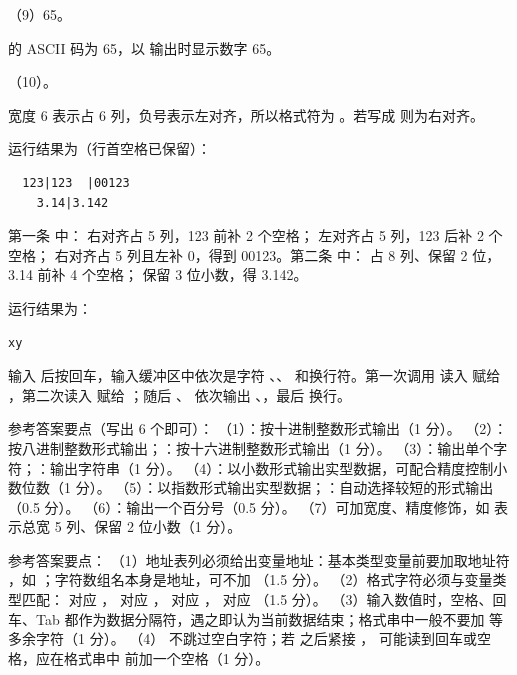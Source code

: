 \documentclass[a4paper,11pt]{article}
\begin{document}
\q （9）65。\begin{analysis} 的 ASCII 码为 65，以  输出时显示数字 65。\end{analysis}

\q （10）。\begin{analysis}宽度 6 表示占 6 列，负号表示左对齐，所以格式符为 。若写成  则为右对齐。\end{analysis}


\q 运行结果为（行首空格已保留）：
\begin{lstlisting}
  123|123  |00123
    3.14|3.142
\end{lstlisting}
\begin{analysis}第一条  中： 右对齐占 5 列，123 前补 2 个空格； 左对齐占 5 列，123 后补 2 个空格； 右对齐占 5 列且左补 0，得到 00123。第二条  中： 占 8 列、保留 2 位，3.14 前补 4 个空格； 保留 3 位小数，得 3.142。\end{analysis}

\q 运行结果为：
\begin{lstlisting}
xy
\end{lstlisting}
\begin{analysis}输入  后按回车，输入缓冲区中依次是字符 、、 和换行符。第一次调用  读入  赋给 ，第二次读入  赋给 ；随后 、 依次输出 、，最后  换行。\end{analysis}


\q 参考答案要点（写出 6 个即可）：
（1）：按十进制整数形式输出（1 分）。
（2）：按八进制整数形式输出；：按十六进制整数形式输出（1 分）。
（3）：输出单个字符；：输出字符串（1 分）。
（4）：以小数形式输出实型数据，可配合精度控制小数位数（1 分）。
（5）：以指数形式输出实型数据；：自动选择较短的形式输出（0.5 分）。
（6）\code{\%\%}：输出一个百分号（0.5 分）。
（7）可加宽度、精度修饰，如  表示总宽 5 列、保留 2 位小数（1 分）。

\q 参考答案要点：
（1）地址表列必须给出变量地址：基本类型变量前要加取地址符 \code{\&}，如 ；字符数组名本身是地址，可不加 \code{\&}（1.5 分）。
（2）格式字符必须与变量类型匹配： 对应 ， 对应 ， 对应 ， 对应 （1.5 分）。
（3）输入数值时，空格、回车、Tab 都作为数据分隔符，遇之即认为当前数据结束；格式串中一般不要加  等多余字符（1 分）。
（4） 不跳过空白字符；若  之后紧接 ， 可能读到回车或空格，应在格式串中  前加一个空格（1 分）。
\end{document}
